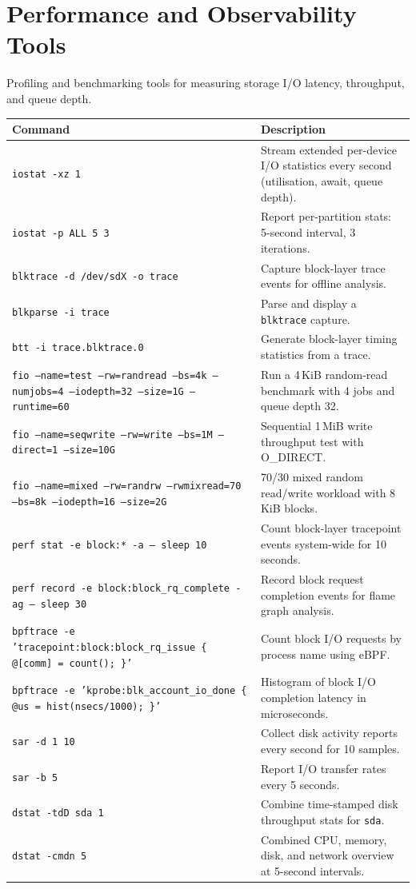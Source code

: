 \section*{Performance and Observability Tools}

Profiling and benchmarking tools for measuring storage I/O latency,
throughput, and queue depth.

\begin{longtable}{p{4cm} p{8cm}}
\toprule
\textbf{Command} & \textbf{Description} \\
\midrule
\endhead
\texttt{iostat -xz 1} & Stream extended per-device I/O statistics every second (utilisation, await, queue depth). \\
\texttt{iostat -p ALL 5 3} & Report per-partition stats: 5-second interval, 3 iterations. \\
\texttt{blktrace -d /dev/sdX -o trace} & Capture block-layer trace events for offline analysis. \\
\texttt{blkparse -i trace} & Parse and display a \texttt{blktrace} capture. \\
\texttt{btt -i trace.blktrace.0} & Generate block-layer timing statistics from a trace. \\
\texttt{fio --name=test --rw=randread --bs=4k --numjobs=4 --iodepth=32 --size=1G --runtime=60} & Run a 4\,KiB random-read benchmark with 4 jobs and queue depth 32. \\
\texttt{fio --name=seqwrite --rw=write --bs=1M --direct=1 --size=10G} & Sequential 1\,MiB write throughput test with O\_DIRECT. \\
\texttt{fio --name=mixed --rw=randrw --rwmixread=70 --bs=8k --iodepth=16 --size=2G} & 70/30 mixed random read/write workload with 8\,KiB blocks. \\
\texttt{perf stat -e block:* -a -- sleep 10} & Count block-layer tracepoint events system-wide for 10 seconds. \\
\texttt{perf record -e block:block\_rq\_complete -ag -- sleep 30} & Record block request completion events for flame graph analysis. \\
\texttt{bpftrace -e 'tracepoint:block:block\_rq\_issue \{ @[comm] = count(); \}'} & Count block I/O requests by process name using eBPF. \\
\texttt{bpftrace -e 'kprobe:blk\_account\_io\_done \{ @us = hist(nsecs/1000); \}'} & Histogram of block I/O completion latency in microseconds. \\
\texttt{sar -d 1 10} & Collect disk activity reports every second for 10 samples. \\
\texttt{sar -b 5} & Report I/O transfer rates every 5 seconds. \\
\texttt{dstat -tdD sda 1} & Combine time-stamped disk throughput stats for \texttt{sda}. \\
\texttt{dstat -cmdn 5} & Combined CPU, memory, disk, and network overview at 5-second intervals. \\
\bottomrule
\end{longtable}

